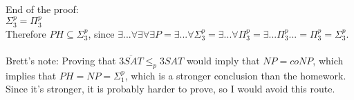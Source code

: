 \documentclass[letterpaper,notitlepage,twoside]{article}
\begin{document}
End of the proof: \\
$\Sigma_3^p = \Pi_3^p$ \\
Therefore $PH \subseteq \Sigma_3^p$, since $\exists...\forall\exists\forall\exists P = \exists...\forall\Sigma_3^p = \exists...\forall\Pi_3^p = \exists...\Pi_3^p ... = \Pi_3^p = \Sigma_3^p$.
\\\\

Brett's note:
Proving that $\overline{3SAT} \leq_p 3SAT$ would imply that $NP = coNP$, which implies that $PH = NP = \Sigma_1^p$, which is a stronger conclusion than the homework. Since it's stronger, it is probably harder to prove, so I would avoid this route.
\end{document}
